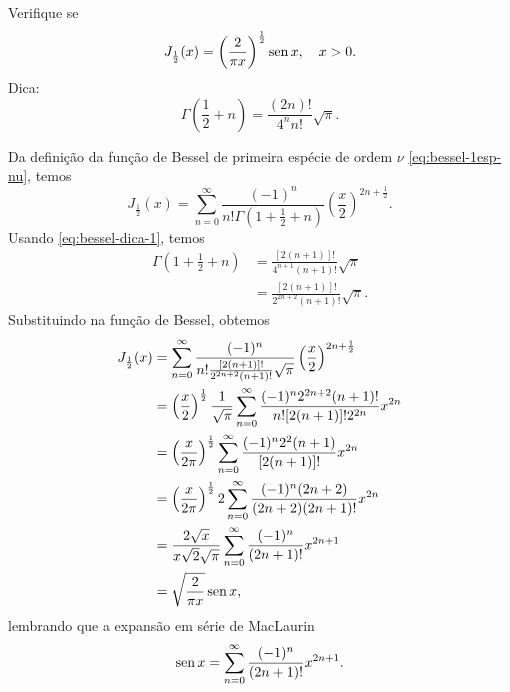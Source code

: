 \begin{exeresol}
  Verifique se
  \begin{equation}
    J_{\frac{1}{2}}(x) = \left(\frac{2}{\pi x}\right)^{\frac{1}{2}}\operatorname{sen} x,\quad x>0.
  \end{equation}
  Dica:
  \begin{equation}\label{eq:bessel-dica-1}
    \Gamma\left(\frac{1}{2}+n\right) = \frac{(2n)!}{4^nn!}\sqrt{\pi}.
  \end{equation}
\end{exeresol}
\begin{resol}
  Da definição da função de Bessel de primeira espécie de ordem $\nu$ \eqref{eq:bessel-1esp-nu}, temos
  \begin{equation}
    J_{\frac{1}{2}}(x) = \sum_{n=0}^\infty \frac{(-1)^n}{n!\Gamma\left(1+\frac{1}{2}+n\right)}\left(\frac{x}{2}\right)^{2n+\frac{1}{2}}.
  \end{equation}
  Usando \eqref{eq:bessel-dica-1}, temos
  \begin{align}
    \Gamma\left(1+\frac{1}{2}+n\right) &= \frac{[2(n+1)]!}{4^{n+1}(n+1)!}\sqrt{\pi}\\
   &= \frac{[2(n+1)]!}{2^{2n+2}(n+1)!}\sqrt{\pi}. 
  \end{align}
  Substituindo na função de Bessel, obtemos
  \begin{align}
    J_{\frac{1}{2}}(x) &= \sum_{n=0}^\infty \frac{(-1)^n}{n!\frac{[2(n+1)]!}{2^{2n+2}(n+1)!}\sqrt{\pi}}\left(\frac{x}{2}\right)^{2n+\frac{1}{2}}\\
                       &= \left(\frac{x}{2}\right)^{\frac{1}{2}}\frac{1}{\sqrt{\pi}}\sum_{n=0}^\infty \frac{(-1)^n2^{2n+2}(n+1)!}{n![2(n+1)]!2^{2n}}x^{2n}\\
                       &= \left(\frac{x}{2\pi}\right)^{\frac{1}{2}}\sum_{n=0}^\infty \frac{(-1)^n2^2(n+1)}{[2(n+1)]!}x^{2n}\\
                       &= \left(\frac{x}{2\pi}\right)^{\frac{1}{2}}2\sum_{n=0}^\infty \frac{(-1)^n(2n+2)}{(2n+2)(2n+1)!}x^{2n}\\
                       &= \frac{2\sqrt{x}}{x\sqrt{2}\sqrt{\pi}}\sum_{n=0}^\infty \frac{(-1)^n}{(2n+1)!}x^{2n+1}\\
                       &= \sqrt{\frac{2}{\pi x}}\operatorname{sen} x,
  \end{align}
  lembrando que a expansão em série de MacLaurin
  \begin{equation}
    \operatorname{sen} x = \sum_{n=0}^\infty \frac{(-1)^n}{(2n+1)!}x^{2n+1}.
  \end{equation}
\end{resol}

